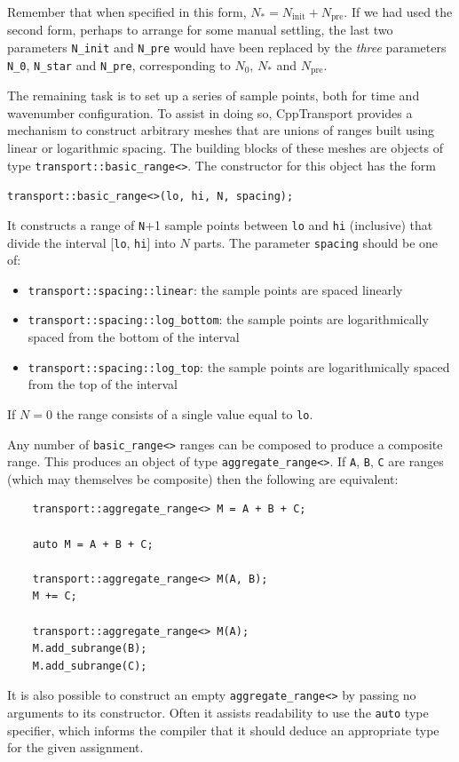 \documentclass[11pt,a4paper]{article}
\newcommand{\Ninit}{N_{\text{init}}}
\newcommand{\Nstar}{N_{\ast}}
\newcommand{\Npre}{N_{\text{pre}}}
\newcommand{\Nzero}{N_{0}}
\newcommand{\packagefont}{\sffamily}
\newcommand{\CppTransport}{{\packagefont CppTransport}}
\newcommand{\semibold}[1]{{\fontseries{b}\selectfont{#1}}}
\newcommand{\para}[1]{\par\vspace{2mm}\noindent\semibold{{#1.}---}\ignorespaces}
\begin{document}
Remember that when specified in this form, $\Nstar = \Ninit + \Npre$.
If we had used the second form, perhaps to arrange for some manual settling,
the last two parameters
\texttt{N_init} and
\texttt{N_pre}
would have been replaced by the \emph{three} parameters
\texttt{N_0},
\texttt{N_star}
and
\texttt{N_pre},
corresponding to $\Nzero$, $\Nstar$ and $\Npre$.

\para{Selecting a mesh of time sample points}
The remaining task is to set up a series of sample points, both for
time and wavenumber configuration.
To assist in doing so, {\CppTransport} provides a mechanism
to construct arbitrary meshes that are unions
of ranges built using
linear or logarithmic spacing.
The building blocks of these meshes
are objects of type
\texttt{transport::basic_range<>}. The constructor for
this object has the form
\begin{center}
    \texttt{transport::basic_range<>(lo, hi, N, spacing);}    
\end{center}
It constructs a range of \texttt{N}+1 sample points between
\texttt{lo}
and
\texttt{hi}
(inclusive)
that divide the interval
[\texttt{lo}, \texttt{hi}] into $N$ parts.
The parameter \texttt{spacing} should be one of:
\begin{itemize}
    \item \texttt{transport::spacing::linear}: the sample points
    are spaced linearly
    
    \item \texttt{transport::spacing::log_bottom}: the sample
    points are logarithmically spaced from the bottom of the interval
    
    \item \texttt{transport::spacing::log_top}: the sample points are
    logarithmically spaced from the top of the interval
\end{itemize}
If $N=0$ the range consists of a single
value equal to \texttt{lo}.

Any number of \texttt{basic_range<>} ranges can be
composed to produce a composite range.
This produces an object of type
\texttt{aggregate_range<>}.
If \texttt{A}, \texttt{B}, \texttt{C}
are ranges (which may themselves be composite) then
the following are equivalent:
\begin{verbatim}
    transport::aggregate_range<> M = A + B + C;
    
    auto M = A + B + C;
    
    transport::aggregate_range<> M(A, B);
    M += C;
    
    transport::aggregate_range<> M(A);
    M.add_subrange(B);
    M.add_subrange(C);
\end{verbatim}
It is also possible to construct an empty
\texttt{aggregate_range<>} by passing no arguments to its
constructor.
Often it assists readability to use the \texttt{auto} type specifier,
which informs the compiler that it should deduce an appropriate type
for the given assignment.
\end{document}
